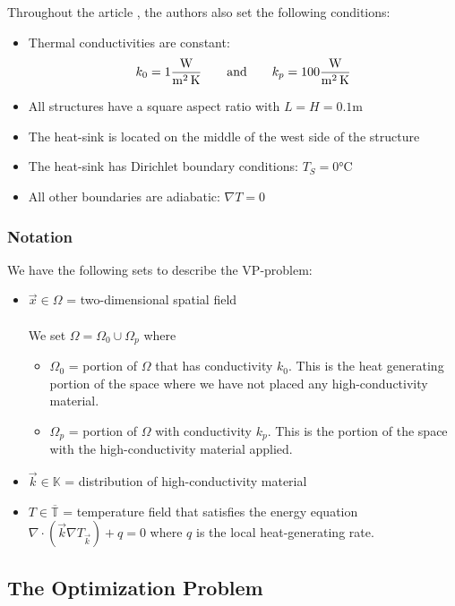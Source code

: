 Throughout the article \cite[]{Marck2012}, the authors also set the following conditions:
\begin{itemize}
	\item Thermal conductivities are constant:
	$$k_0=1 \si[per-mode=fraction]{\watt\per\square\meter\per\kelvin}\qquad\text{and}\qquad k_p=100 \si[per-mode=fraction]{\watt\per\square\meter\per\kelvin}$$
	\item All structures have a square aspect ratio with $L=H=0.1\si{\meter}$
	\item The heat-sink is located on the middle of the west side of the structure
	\item The heat-sink has Dirichlet boundary conditions: $T_S=0\si{\celsius}$
	\item All other boundaries are adiabatic: $\nabla T=0$
\end{itemize}

\subsubsection*{Notation}

We have the following sets to describe the VP-problem:
\begin{itemize}
	\item $\vec{x}\in\Omega$ = two-dimensional spatial field\\\\
	We set $\Omega = \Omega_0\cup\Omega_p$ where
	\begin{itemize}
		\item $\Omega_0$ = portion of $\Omega$ that has conductivity $k_0$. This is the heat generating portion of the space where we have not placed any high-conductivity material.
		\item $\Omega_p$ = portion of $\Omega$ with conductivity $k_p$. This is the portion of the space with the high-conductivity material applied.
	\end{itemize}
	\item $\vec{k}\in\mathbb{K}$ = distribution of high-conductivity material
	\item $T\in\overline{\mathbb{T}}$ = temperature field that satisfies the energy equation {\color{baystate}$\nabla\cdot\left(\vec{k}\nabla T_{\vec{k}}\right)+q=0$} where $q$ is the local heat-generating rate.
\end{itemize}

\subsection{The Optimization Problem}

